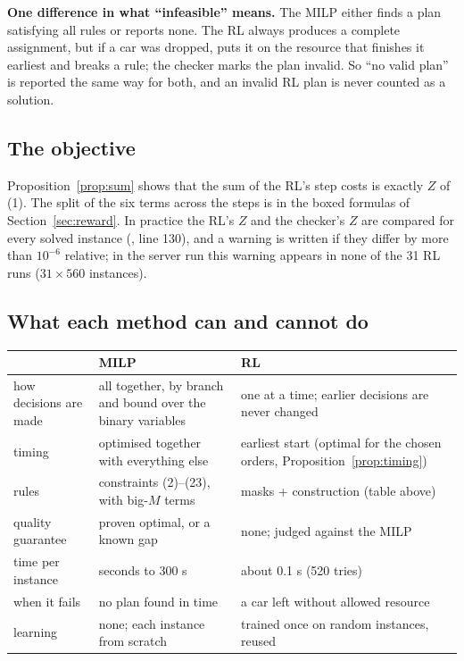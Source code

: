 \textbf{One difference in what ``infeasible'' means.} The MILP either finds a plan satisfying all rules or reports none. The RL always produces a complete assignment, but if a car was dropped,  puts it on the resource that finishes it earliest and breaks a rule; the checker marks the plan invalid. So ``no valid plan'' is reported the same way for both, and an invalid RL plan is never counted as a solution.

\subsection{The objective}

Proposition~\ref{prop:sum} shows that the sum of the RL's step costs is exactly $Z$ of (1). The split of the six terms across the steps is in the boxed formulas of Section~\ref{sec:reward}. In practice the RL's $Z$ and the checker's $Z$ are compared for every solved instance (, line 130), and a warning is written if they differ by more than $10^{-6}$ relative; in the server run this warning appears in none of the 31 RL runs ($31\times560$ instances).

\subsection{What each method can and cannot do}

\begin{table}[H]
\centering\small
\begin{tabularx}{\textwidth}{@{}>{\raggedright\arraybackslash}p{3.4cm}>{\raggedright\arraybackslash}X>{\raggedright\arraybackslash}X@{}}
\toprule
 & MILP & RL \\
\midrule
how decisions are made & all together, by branch and bound over the binary variables & one at a time; earlier decisions are never changed \\
timing & optimised together with everything else & earliest start (optimal for the chosen orders, Proposition~\ref{prop:timing}) \\
rules & constraints (2)--(23), with big-$M$ terms & masks + construction (table above) \\
quality guarantee & proven optimal, or a known gap & none; judged against the MILP \\
time per instance & seconds to 300 s & about 0.1 s (520 tries) \\
when it fails & no plan found in time & a car left without allowed resource \\
learning & none; each instance from scratch & trained once on random instances, reused \\
\bottomrule
\end{tabularx}
\end{table}

